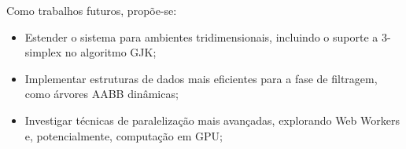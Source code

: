 Como trabalhos futuros, propõe-se:
\begin{itemize}
	\item Estender o sistema para ambientes tridimensionais, incluindo o suporte a 3-simplex no algoritmo GJK;
	\item Implementar estruturas de dados mais eficientes para a fase de filtragem, como árvores AABB dinâmicas;
	\item Investigar técnicas de paralelização mais avançadas, explorando Web Workers e, potencialmente, computação em GPU;
\end{itemize}




